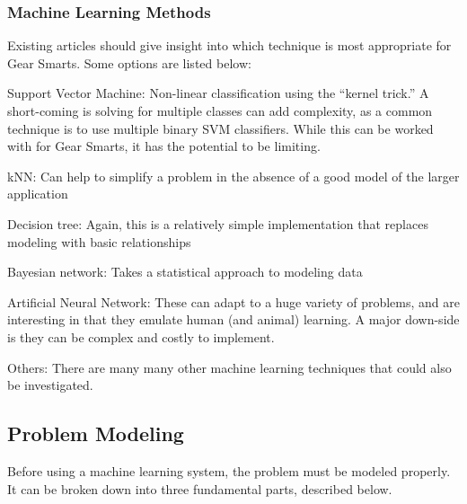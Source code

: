 \subsubsection{Machine Learning Methods}
\label{subsection:mloptions}
Existing articles should give insight into which technique is
most appropriate for Gear Smarts. Some options are listed below:

\begin{description}
  \item{Support Vector Machine:} Non-linear classification using the ``kernel trick.'' A short-coming is solving for multiple
  classes can add complexity, as a common technique is to use multiple binary SVM classifiers. While this can be worked with
  for Gear Smarts, it has the potential to be limiting.
  \item{kNN:} Can help to simplify a problem in the absence of a good model of the larger application
  \item{Decision tree:} Again, this is a relatively simple implementation that replaces modeling with basic relationships
  \item{Bayesian network:} Takes a statistical approach to modeling data
  \item{Artificial Neural Network:} These can adapt to a huge variety of problems, and are interesting in that they emulate
  human (and animal) learning. A major down-side is they can be complex and costly to implement.
  \item{Others:} There are many many other machine learning techniques that could also be investigated.
\end{description}

\subsection{Problem Modeling}
Before using a machine learning system, the problem must be modeled properly. It can be broken down into three fundamental parts,
described below.

